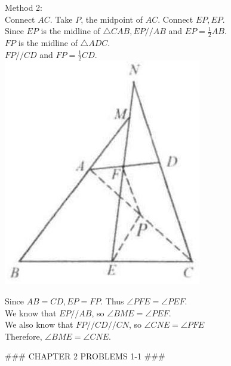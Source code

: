 \documentclass[10pt]{article}
\begin{document}
Method 2:\\
Connect \(A C\). Take \(P\), the midpoint of \(A C\). Connect \(E P, E P\).\\
Since \(E P\) is the midline of \(\triangle C A B, E P / / A B\) and \(E P=\frac{1}{2} A B\).\\
\(F P\) is the midline of \(\triangle A D C\).\\
\(F P / / C D\) and \(F P=\frac{1}{2} C D\).\\
\includegraphics[max width=\textwidth, center]{2025_04_17_97bc1f7e44d93c271a88g-043}

Since \(A B=C D, E P=F P\). Thus \(\angle P F E=\angle P E F\).\\
We know that \(E P / / A B\), so \(\angle B M E=\angle P E F\).\\
We also know that \(F P / / C D / / C N\), so \(\angle C N E=\angle P F E\)\\
Therefore, \(\angle B M E=\angle C N E\).


### CHAPTER 2 PROBLEMS 1-1 ###
\end{document}
